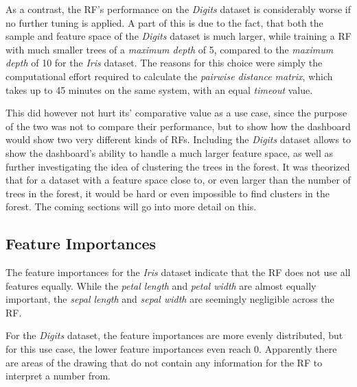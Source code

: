 \documentclass[a4paper, 12pt]{article}
\begin{document}
As a contrast, the RF's performance on the \textit{Digits} dataset is considerably worse if no further
tuning is applied. A part of this is due to the fact, that both the sample and feature space of the
\textit{Digits} dataset is much larger, while training a RF with much smaller trees of a
\textit{maximum depth} of 5, compared to the \textit{maximum depth} of 10 for the \textit{Iris} dataset.
The reasons for this choice were simply the computational effort required to calculate the
\textit{pairwise distance matrix}, which takes up to 45 minutes on the same system, with an equal
\textit{timeout} value. \par

This did however not hurt its' comparative value as a use case, since the purpose of the two was not to
compare their performance, but to show how the dashboard would show two very different kinds of RFs.
Including the \textit{Digits} dataset allows to show the dashboard's ability to handle a much larger
feature space, as well as further investigating the idea of clustering the trees in the forest.
It was theorized that for a dataset with a feature space close to, or even larger than the number of
trees in the forest, it would be hard or even impossible to find clusters in the forest. The coming
sections will go into more detail on this. \par

\subsection{Feature Importances}
The feature importances for the \textit{Iris} dataset indicate that the RF does not use all features
equally. While the \textit{petal length} and \textit{petal width} are almost equally important,
the \textit{sepal length} and \textit{sepal width} are seemingly negligible across the RF. \par

For the \textit{Digits} dataset, the feature importances are more evenly distributed, but for this use
case, the lower feature importances even reach 0. Apparently there are areas of the drawing that do not
contain any information for the RF to interpret a number from. \par
\end{document}
